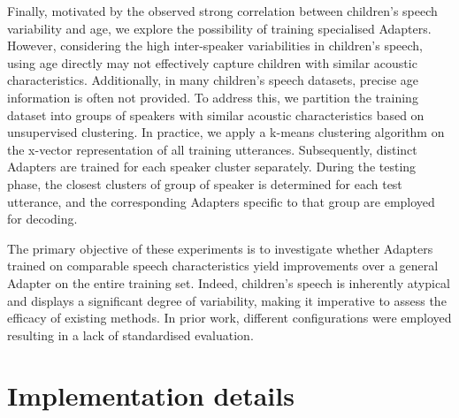Finally, motivated by the observed strong correlation between children's speech variability and age, we explore the possibility of training specialised Adapters. However, considering the high inter-speaker variabilities in children's speech, using age directly may not effectively capture children with similar acoustic characteristics. Additionally, in many children's speech datasets, precise age information is often not provided. To address this, we partition the training dataset into groups of speakers with similar acoustic characteristics based on unsupervised clustering.
In practice, we apply a k-means clustering algorithm on the x-vector representation \cite{snyder2018x} of all training utterances. Subsequently, distinct Adapters are trained for each speaker cluster separately. During the testing phase, the closest clusters of group of speaker is determined for each test utterance, and the corresponding Adapters specific to that group are employed for decoding.

The primary objective of these experiments is to investigate whether Adapters trained on comparable speech characteristics yield improvements over a general Adapter on the entire training set. Indeed,
children's speech is inherently atypical and displays a significant degree of variability, making it imperative to assess the efficacy of existing methods. In prior work, different configurations were employed resulting in a lack of standardised evaluation.

\section{Implementation details}

